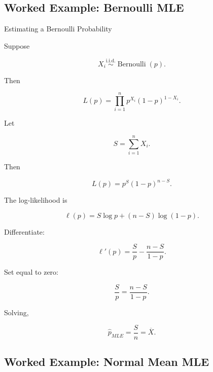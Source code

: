 \subsection{Worked Example: Bernoulli MLE}
\label{subsec:worked-bernoulli-mle}

\begin{workedexamplebox}{Estimating a Bernoulli Probability}

Suppose

\[
X_i
\overset{\text{i.i.d.}}{\sim}
\operatorname{Bernoulli}(p).
\]

Then

\[
L(p)
=
\prod_{i=1}^{n}
p^{X_i}
(1-p)^{1-X_i}.
\]

Let

\[
S
=
\sum_{i=1}^{n}X_i.
\]

Then

\[
L(p)
=
p^S
(1-p)^{n-S}.
\]

The log-likelihood is

\[
\ell(p)
=
S\log p
+
(n-S)\log(1-p).
\]

Differentiate:

\[
\ell'(p)
=
\frac{S}{p}
-
\frac{n-S}{1-p}.
\]

Set equal to zero:

\[
\frac{S}{p}
=
\frac{n-S}{1-p}.
\]

Solving,

\begin{answerbox}
\[
\boxed{
\widehat{p}_{MLE}
=
\frac{S}{n}
=
\overline{X}.
}
\]
\end{answerbox}

\end{workedexamplebox}

\subsection{Worked Example: Normal Mean MLE}
\label{subsec:worked-normal-mean-mle}

